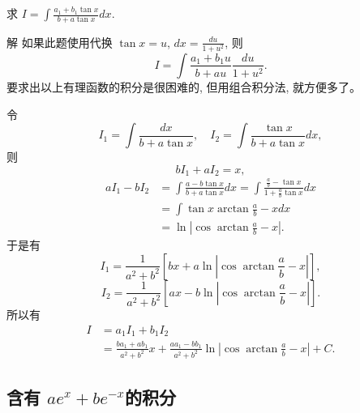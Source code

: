 \documentclass[lang=cn,newtx,10pt,scheme=chinese]{elegantbook}
\begin{document}
\begin{example}
  求 $I = \int \frac{a_1 + b_1 \tan x}{b + a \tan x} dx$.
\end{example}
\begin{solution}
  解 如果此题使用代换 $\tan x = u$, $dx = \frac{du}{1 + u^2}$, 则
  $$
  I = \int \frac{a_1 + b_1 u}{b + au} \frac{du}{1 + u^2}.
  $$
  要求出以上有理函数的积分是很困难的, 但用组合积分法, 就方便多了。

  令
  $$
  I_1 = \int \frac{dx}{b + a \tan x}, \quad I_2 = \int \frac{\tan x}{b + a \tan x} dx,
  $$
  则
  $$
  b I_1 + a I_2 = x,
  $$
  $$
  \begin{aligned}
  a I_1 - b I_2 &= \int \frac{a - b \tan x}{b + a \tan x} dx = \int \frac{\frac{a}{b} - \tan x}{1 + \frac{a}{b} \tan x} dx \\
  &= \int \tan x \arctan \frac{a}{b} - x dx \\
  &= \ln \left| \cos \arctan \frac{a}{b} - x \right|.
  \end{aligned}
  $$
  于是有
  $$
  I_1 = \frac{1}{a^2 + b^2} \left[ bx + a \ln\left| \cos \arctan \frac{a}{b} - x \right| \right],
  $$
  $$
  I_2 = \frac{1}{a^2 + b^2} \left[ ax - b \ln\left| \cos \arctan \frac{a}{b} - x \right| \right].
  $$
  所以有
  $$
  \begin{aligned}
  I &= a_1 I_1 + b_1 I_2 \\
  &= \frac{b a_1 + a b_1}{a^2 + b^2} x + \frac{a a_1 - b b_1}{a^2 + b^2} \ln\left| \cos \arctan \frac{a}{b} - x \right| + C.
  \end{aligned}
  $$
\end{solution}

\subsection{含有 $a e^{x} + be^{- x}$的积分}
\end{document}
